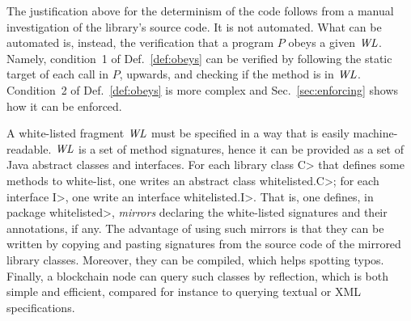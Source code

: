 The justification above for the determinism of the code follows from
a manual investigation of the library's source code. It is not automated. What can
be automated is, instead, the verification that a program $P$ obeys a given $\mathit{WL}$.
Namely, condition~1 of Def.~\ref{def:obeys} can be verified
by following the static target of each call in $P$, upwards,
and checking if the method is in $\mathit{WL}$.
Condition~2 of Def.~\ref{def:obeys} is more complex and
Sec.~\ref{sec:enforcing} shows how it can be enforced.

A white-listed fragment $\mathit{WL}$ must be specified in a way that is easily machine-readable.
$\mathit{WL}$ is a set of method signatures, hence it can be provided
as a set of Java abstract classes and interfaces. For each library class \<C> that defines some
methods to white-list, one writes an abstract class \<whitelisted.C>;
for each interface \<I>, one write an interface \<whitelisted.I>. That is, one defines,
in package \<whitelisted>, \emph{mirrors} declaring the white-listed signatures and
their annotations, if any.
The advantage of using such mirrors is that they can be written by copying and pasting
signatures from the source code of the mirrored library classes. Moreover, they can be compiled,
which helps spotting typos. Finally, a blockchain node can query such classes by reflection,
which is both simple and efficient, compared for instance to querying textual or XML
specifications.

